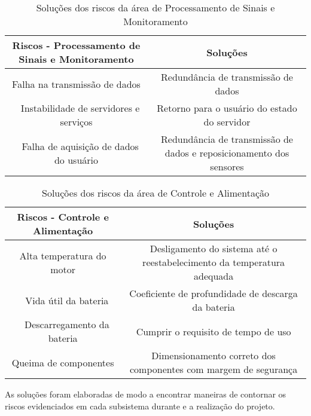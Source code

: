 \begin{table}[h]
\centering
\vspace{0.5cm}
\begin{tabular}{|c|c|}
\hline
Riscos - Processamento de Sinais e Monitoramento         & Soluções \\
\hline
Falha na transmissão de dados             & Redundância de transmissão de dados \\ 
Instabilidade de servidores e serviços    & Retorno para o usuário do estado do servidor \\ 
Falha de aquisição de dados do usuário    & Redundância de transmissão de dados e reposicionamento dos sensores \\
\hline
\end{tabular}
\caption{Soluções dos riscos da área de Processamento de Sinais e Monitoramento}
\label{tab:riscosubareacont}
\end{table}

\begin{table}[h]
\centering
\vspace{0.5cm}
\begin{tabular}{|c|c|}
\hline
Riscos - Controle e Alimentação & Soluções \\
\hline
Alta temperatura do motor     & Desligamento do sistema até o reestabelecimento da temperatura adequada \\ 
Vida útil da bateria          & Coeficiente de profundidade de descarga da bateria \\ 
Descarregamento da bateria    & Cumprir o requisito de tempo de uso \\
Queima de componentes         & Dimensionamento correto dos componentes com margem de segurança \\
\hline
\end{tabular}
\caption{Soluções dos riscos da área de Controle e Alimentação}
\label{tab:riscosubareaalim}
\end{table}

As soluções foram elaboradas de modo a encontrar maneiras de contornar os riscos
evidenciados em cada subsistema durante e a realização do projeto.
